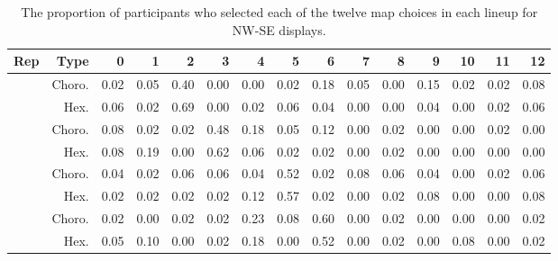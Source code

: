 \documentclass{monashthesis}
\begin{document}
\begin{Shaded}
\begin{Highlighting}[]
{{{{{{{{{{    \NormalTok{, }\NormalTok{, }\NormalTok{))}
\end{Highlighting}
\end{Shaded}

\begin{table}

\caption{\label{tab:choice-nwse}The proportion of participants who selected each of the twelve map choices in each lineup for NW-SE displays.}
\centering
\begin{tabular}[t]{rrrrrrrrrrrrrrr}
\toprule
Rep & Type & 0 & 1 & 2 & 3 & 4 & 5 & 6 & 7 & 8 & 9 & 10 & 11 & 12\\
\midrule
 & Choro. & 0.02 & 0.05 & 0.40 & 0.00 & 0.00 & 0.02 & 0.18 & 0.05 & 0.00 & 0.15 & 0.02 & 0.02 & 0.08\\
\cmidrule{2-15}
\multirow{-2}{*}{\raggedleft\arraybackslash 1} & Hex. & 0.06 & 0.02 & 0.69 & 0.00 & 0.02 & 0.06 & 0.04 & 0.00 & 0.00 & 0.04 & 0.00 & 0.02 & 0.06\\
\cmidrule{1-15}
 & Choro. & 0.08 & 0.02 & 0.02 & 0.48 & 0.18 & 0.05 & 0.12 & 0.00 & 0.02 & 0.00 & 0.00 & 0.02 & 0.00\\
\cmidrule{2-15}
\multirow{-2}{*}{\raggedleft\arraybackslash 2} & Hex. & 0.08 & 0.19 & 0.00 & 0.62 & 0.06 & 0.02 & 0.02 & 0.00 & 0.02 & 0.00 & 0.00 & 0.00 & 0.00\\
\cmidrule{1-15}
 & Choro. & 0.04 & 0.02 & 0.06 & 0.06 & 0.04 & 0.52 & 0.02 & 0.08 & 0.06 & 0.04 & 0.00 & 0.02 & 0.06\\
\cmidrule{2-15}
\multirow{-2}{*}{\raggedleft\arraybackslash 3} & Hex. & 0.02 & 0.02 & 0.02 & 0.02 & 0.12 & 0.57 & 0.02 & 0.00 & 0.02 & 0.08 & 0.00 & 0.00 & 0.08\\
\cmidrule{1-15}
 & Choro. & 0.02 & 0.00 & 0.02 & 0.02 & 0.23 & 0.08 & 0.60 & 0.00 & 0.02 & 0.00 & 0.00 & 0.00 & 0.02\\
\cmidrule{2-15}
\multirow{-2}{*}{\raggedleft\arraybackslash 4} & Hex. & 0.05 & 0.10 & 0.00 & 0.02 & 0.18 & 0.00 & 0.52 & 0.00 & 0.02 & 0.00 & 0.08 & 0.00 & 0.02\\
\bottomrule
\end{tabular}
\end{table}
\end{document}
